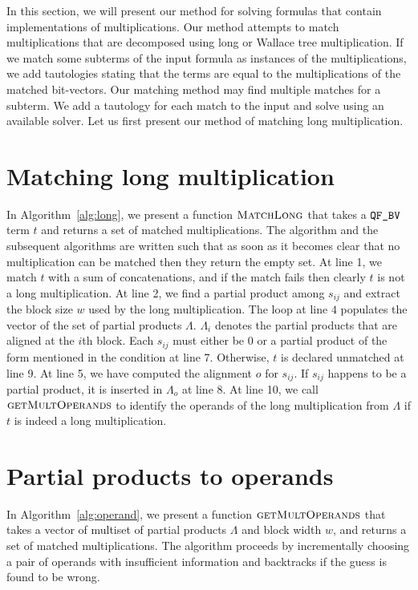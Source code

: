 %
In this section, we will present our method for solving
formulas that contain implementations of multiplications.
%
Our method attempts to match multiplications that
are decomposed using long or Wallace tree multiplication.
%
If we match some subterms of the input formula
as instances of the
multiplications, we add tautologies stating that the terms are 
equal to the multiplications of the matched bit-vectors.
%
Our matching method may find multiple matches for a subterm.
%
We add a tautology for each match to the input and solve using
an available solver.
%
Let us first present our method of matching long multiplication. 

\section{Matching long multiplication}


In Algorithm~\ref{alg:long}, we present a function $\textsc{MatchLong}$
that takes a $\texttt{QF\_BV}$ term $t$ and returns a set of matched multiplications.
%
The algorithm and the subsequent algorithms are written such that as soon
as it becomes clear that no multiplication can be matched then
they return the empty set. 
%
At line 1, we match $t$ with a sum of concatenations, and if the match fails
then clearly $t$ is not a long multiplication.
%
At line 2, we find a partial product among $s_{ij}$ and extract
the block size $w$ used by the long multiplication.
%
The loop at line $4$ populates the vector of the set of partial products $\Lambda$.
%
$\Lambda_i$ denotes the partial products that are aligned at the $i$th block.
%
Each $s_{ij}$ must either be $0$ or a partial product of the form mentioned in the
condition at line 7.
%
Otherwise, $t$ is declared unmatched at line 9. 
%
At line 5, we have computed the alignment $o$ for $s_{ij}$.
%
If $s_{ij}$ happens to be a partial product, it is inserted in
$\Lambda_o$ at line 8.
%
At line 10, we call $\textsc{getMultOperands}$ to identify the operands
of the long multiplication from $\Lambda$ if $t$ is indeed a long
multiplication.

\section{Partial products to operands}


In Algorithm~\ref{alg:operand}, we present a function
$\textsc{getMultOperands}$ that takes a vector of multiset of partial
products $\Lambda$ and block width $w$, and returns a set of matched
multiplications.
%
The algorithm proceeds by incrementally choosing a pair of operands with
insufficient information and backtracks if the guess is found to be
wrong.


